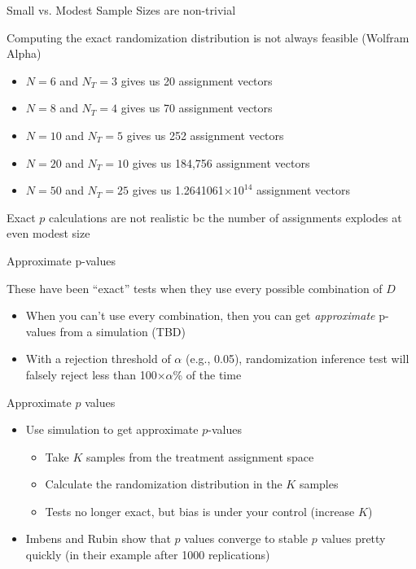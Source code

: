 \documentclass{beamer}
\begin{document}
\begin{frame}{Small vs. Modest Sample Sizes are non-trivial}

Computing the exact randomization distribution is not always feasible (Wolfram Alpha)
\begin{itemize}
\item $N=6$ and $N_T=3$ gives us 20 assignment vectors
\item $N=8$ and $N_T=4$ gives us 70 assignment vectors
\item $N=10$ and $N_T=5$ gives us 252 assignment vectors
\item $N=20$ and $N_T=10$ gives us 184,756 assignment vectors
\item $N=50$ and $N_T=25$ gives us 1.2641061$\times 10^{14}$ assignment vectors
\end{itemize}
Exact $p$ calculations are not realistic bc the number of assignments explodes at even modest size

\end{frame}



\begin{frame}{Approximate p-values}

These have been ``exact'' tests when they use every possible combination of $D$ 
	\begin{itemize}
	\item When you can't use every combination, then you can get \emph{approximate} p-values from a simulation (TBD)
	\item With a rejection threshold of $\alpha$ (e.g., 0.05), randomization inference test will falsely reject less than 100$\times \alpha$\% of the time
	\end{itemize}

\end{frame}
\begin{frame}{Approximate $p$ values}

\begin{itemize}
\item Use simulation to get approximate $p$-values
	\begin{itemize}
	\item Take $K$ samples from the treatment assignment space
	\item Calculate the randomization distribution in the $K$ samples
	\item Tests no longer exact, but bias is under your control (increase $K$)
	\end{itemize}
\item Imbens and Rubin show that $p$ values converge to stable $p$ values pretty quickly (in their example after 1000 replications)
\end{itemize}

\end{frame}
\end{document}
